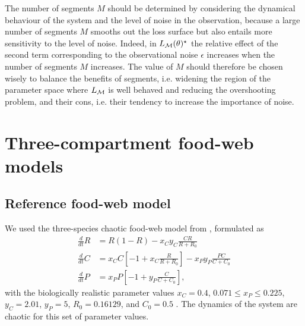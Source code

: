 The number of segments $M$ should be determined by considering the dynamical behaviour of the system and the level of noise in the observation, because a large number of segments $M$ smooths out the loss surface but also entails more sensitivity to the level of noise. Indeed, in $L_{\mathcal{M}}(\theta)^\star$ the relative effect of the second term corresponding to the observational noise $\epsilon$ increases when the number of segments $M$ increases.
%
The value of $M$ should therefore be chosen wisely to balance the benefits of segments, i.e. widening the region of the parameter space where $L_{\mathcal{M}}$ is well behaved and reducing the overshooting problem, and their cons, i.e. their tendency to increase the importance of noise. 

\section{Three-compartment food-web models}
\label{secSI:models}
\subsection{Reference food-web model}
We used the three-species chaotic food-web model from \citep{Hastings1991}, formulated as
\begin{equation}
    \begin{aligned}
        \tfrac{d}{dt} R &= R ( 1 - R ) - x_C y_C \frac{CR}{R + R_0}\\
        \tfrac{d}{dt} C &= x_C C \left[ -1 + x_C \frac{R}{R + R_0} \right] - x_P y_P \frac{PC}{C + C_0}\\
        \tfrac{d}{dt} P &= x_P P \left[ -1 + y_P \frac{C}{C+C_0} \right],
    \end{aligned}
\end{equation}
with the biologically realistic parameter values $x_C = 0.4$, $0.071 \leq x_P \leq 0.225 $, $y_C = 2.01$, $y_P = 5$, $R_0 = 0.16129$, and $C_0 = 0.5$ \citep{McCann1994}. The dynamics of the system are chaotic for this set of parameter values.

